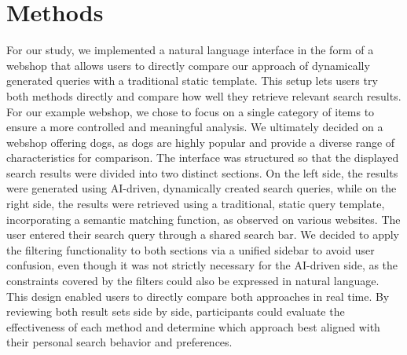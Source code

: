 \documentclass[../../submission.tex]{subfiles}
\begin{document}
\section{Methods}
For our study, we implemented a natural language interface in the form of a webshop that allows users to directly compare our approach of dynamically generated queries with a traditional static template. This setup lets users try both methods directly and compare how well they retrieve relevant search results. For our example webshop, we chose to focus on a single category of items to ensure a more controlled and meaningful analysis. We ultimately decided on a webshop offering dogs, as dogs are highly popular and provide a diverse range of characteristics for comparison.
The interface was structured so that the displayed search results were divided into two distinct sections. On the left side, the results were generated using AI-driven, dynamically created search queries, while on the right side, the results were retrieved using a traditional, static query template, incorporating a semantic matching function, as observed on various websites. The user entered their search query through a shared search bar. We decided to apply the filtering functionality to both sections via a unified sidebar to avoid user confusion, even though it was not strictly necessary for the AI-driven side, as the constraints covered by the filters could also be expressed in natural language. 
This design enabled users to directly compare both approaches in real time. By reviewing both result sets side by side, participants could evaluate the effectiveness of each method and determine which approach best aligned with their personal search behavior and preferences.
\end{document}
